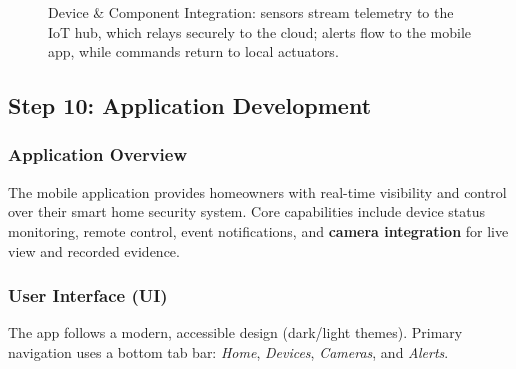 \documentclass[conference]{IEEEtran}
\begin{document}
\begin{figure}[h]
{%
  }
  \caption{Device \& Component Integration: sensors stream telemetry to the IoT hub, which relays securely to the cloud; alerts flow to the mobile app, while commands return to local actuators.}
  \label{fig:device_integration_tikz}

\end{figure}
\FloatBarrier


\subsection{Step 10: Application Development}

\subsubsection{Application Overview}
The mobile application provides homeowners with real-time visibility and control over their smart home security system. Core capabilities include device status monitoring, remote control, event notifications, and \textbf{camera integration} for live view and recorded evidence.

\subsubsection{User Interface (UI)}
The app follows a modern, accessible design (dark/light themes). Primary navigation uses a bottom tab bar: \emph{Home}, \emph{Devices}, \emph{Cameras}, and \emph{Alerts}.
\end{document}
